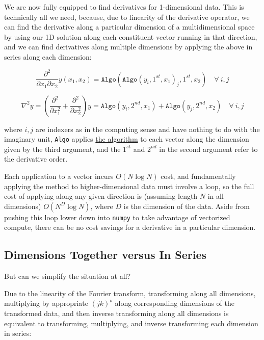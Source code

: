 \documentclass[10pt]{article}
\begin{document}
We are now fully equipped to find derivatives for 1-dimensional data. This is technically all we need, because, due to linearity of the derivative operator, we can find the derivative along a particular dimension of a multidimensional space by using our 1D solution along each constituent vector running in that direction, and we can find derivatives along multiple dimensions by applying the above in series along each dimension:

$$\frac{\partial^2}{\partial x_1 \partial x_2} y(x_1, x_2) = \texttt{Algo}(\texttt{Algo}(y_i, 1^{st}, x_1)_j, 1^{st}, x_2) \quad \forall\ i, j$$

$$ \nabla^2 y = (\frac{\partial^2}{\partial x_1^2} + \frac{\partial^2}{\partial x_2^2}) y = \texttt{Algo}(y_i, 2^{nd}, x_1) + \texttt{Algo}(y_j, 2^{nd}, x_2) \quad \forall\ i, j$$

where $i, j$ are indexers as in the computing sense and have nothing to do with the imaginary unit, \texttt{Algo} applies \hyperref[algo]{the algorithm} to each vector along the dimension given by the third argument, and the $1^{st}$ and $2^{nd}$ in the second argument refer to the derivative order.

Each application to a vector incurs $O(N \log N)$ cost, and fundamentally applying the method to higher-dimensional data must involve a loop, so the full cost of applying along any given direction is (assuming length $N$ in all dimensions) $O(N^D \log N)$, where $D$ is the dimension of the data. Aside from pushing this loop lower down into \texttt{numpy} to take advantage of vectorized compute, there can be no cost savings for a derivative in a particular dimension.

\subsection{Dimensions Together versus In Series}

But can we simplify the situation at all?

Due to the linearity of the Fourier transform, transforming along all dimensions, multiplying by appropriate $(jk)^\nu$ along corresponding dimensions of the transformed data, and then inverse transforming along all dimensions is equivalent to transforming, multiplying, and inverse transforming each dimension in series\cite{johnson}:
\end{document}
